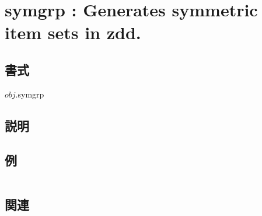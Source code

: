 
\section{symgrp : Generates symmetric item sets in zdd.\label{sect:symgrp}}
\subsection*{書式}
$obj$.symgrp

\subsection*{説明}


\subsection*{例}
\begin{Verbatim}[baselinestretch=0.7,frame=single]

\end{Verbatim}

\subsection*{関連}

